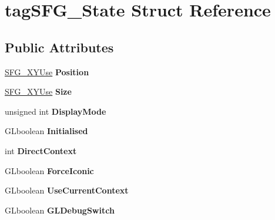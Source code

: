 \hypertarget{structtag_s_f_g___state}{}\section{tag\+S\+F\+G\+\_\+\+State Struct Reference}
\label{structtag_s_f_g___state}
\subsection*{Public Attributes}
\begin{DoxyCompactItemize}
\item 
\hyperlink{structtag_s_f_g___x_y_use}{S\+F\+G\+\_\+\+X\+Y\+Use} {\bfseries Position}\hypertarget{structtag_s_f_g___state_a22581b5b976b2df32dd90213eb3bd673}{}\label{structtag_s_f_g___state_a22581b5b976b2df32dd90213eb3bd673}

\item 
\hyperlink{structtag_s_f_g___x_y_use}{S\+F\+G\+\_\+\+X\+Y\+Use} {\bfseries Size}\hypertarget{structtag_s_f_g___state_a74f5f46ca3f850b42d5f189689cb6151}{}\label{structtag_s_f_g___state_a74f5f46ca3f850b42d5f189689cb6151}

\item 
unsigned int {\bfseries Display\+Mode}\hypertarget{structtag_s_f_g___state_a40b7bb0b081398bbbbf93b58407ad7e3}{}\label{structtag_s_f_g___state_a40b7bb0b081398bbbbf93b58407ad7e3}

\item 
G\+Lboolean {\bfseries Initialised}\hypertarget{structtag_s_f_g___state_a1e2673037c080a1cf5bc3fd75dc83ee4}{}\label{structtag_s_f_g___state_a1e2673037c080a1cf5bc3fd75dc83ee4}

\item 
int {\bfseries Direct\+Context}\hypertarget{structtag_s_f_g___state_a750e2add46cce1023d371385673e9f30}{}\label{structtag_s_f_g___state_a750e2add46cce1023d371385673e9f30}

\item 
G\+Lboolean {\bfseries Force\+Iconic}\hypertarget{structtag_s_f_g___state_a68242b8f6bec9273b1b99e503c4f4ff6}{}\label{structtag_s_f_g___state_a68242b8f6bec9273b1b99e503c4f4ff6}

\item 
G\+Lboolean {\bfseries Use\+Current\+Context}\hypertarget{structtag_s_f_g___state_a76603af510923eca689412c75280c1f1}{}\label{structtag_s_f_g___state_a76603af510923eca689412c75280c1f1}

\item 
G\+Lboolean {\bfseries G\+L\+Debug\+Switch}\hypertarget{structtag_s_f_g___state_af1fa657185d5d3e7a898ce52ff60426e}{}\label{structtag_s_f_g___state_af1fa657185d5d3e7a898ce52ff60426e}


\end{DoxyCompactItemize}
